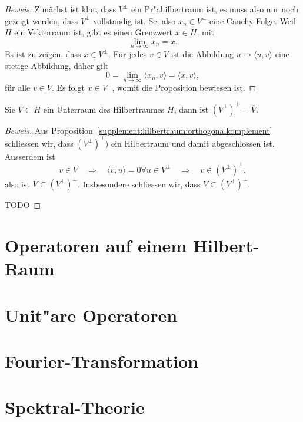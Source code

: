 \begin{proof}[Beweis]
Zunächst ist klar, dass $V^\perp$ ein Pr"ahilbertraum ist, es muss
also nur noch gezeigt werden, dass $V^\perp$ vollständig ist.
Sei also $x_n\in V^\perp$ eine Cauchy-Folge.
Weil $H$ ein Vektorraum ist, gibt es einen Grenzwert $x\in H$, mit
\[
\lim_{n\to\infty} x_n=x.
\]
Es ist zu zeigen, dass $x\in V^\perp$.
Für jedes $v\in V$ ist die Abbildung $u\mapsto \langle u,v\rangle$ eine
stetige Abbildung, daher gilt
\[
0=\lim_{n\to\infty} \langle x_n,v\rangle = \langle x,v\rangle,
\]
für alle $v\in V$.
Es folgt $x\in V^\perp$, womit die Proposition bewiesen ist.
\end{proof}

\begin{proposition}
Sie $V\subset H$ ein Unterraum des Hilbertraumes $H$, dann ist
$(V^\perp)^\perp=\overline V$.
\end{proposition}

\begin{proof}[Beweis]
Aus Proposition~\ref{supplement:hilbertraum:orthogonalkomplement}
schliessen wir, dass $(V^\perp)^\perp)$ ein Hilbertraum und damit
abgeschlossen ist.
Ausserdem ist
\[
v\in V
\quad\Rightarrow\quad
\langle v,u\rangle = 0\forall u\in V^\perp
\quad\Rightarrow\quad
v\in (V^\perp)^\perp,
\]
also ist $V\subset (V^\perp)^\perp$.
Insbesondere schliessen wir, dass $\overline V\subset (V^\perp)^\perp$.

TODO
\end{proof}

\section{Operatoren auf einem Hilbert-Raum}

\section{Unit"are Operatoren}

\section{Fourier-Transformation}

\section{Spektral-Theorie}





